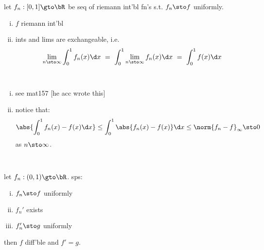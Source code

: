 \begin{lm}
    let $f_{n}:[0,1]\gto\bR$ be seq of riemann int'bl fn's s.t. $f_{n}\sto f$ uniformly.
	\begin{enumerate}[(i)]
		\item $f$ riemann int'bl
		\item ints and lims are exchangeable, i.e.
			\begin{equation*}
			    \lim_{n\sto\infty}\int_{0}^{1}f_{n}(x)\d x
				\ = \ \int_{0}^{1}\lim_{n\sto\infty}f_{n}(x)\d x
				\ = \ \int_{0}^{1}f(x)\d x
			\end{equation*}
	\end{enumerate}
\end{lm} \

\newpage
\begin{pf}[source=Primary Source Material]
    \vspace{-0.2in}
	\begin{enumerate}[(i)]
		\item see mat157 [he acc wrote this]
		\item notice that:
			\begin{equation*}
			    \abs{\int_{0}^{1}f_{n}(x)-f(x)\d x} \leq
				\int_{0}^{1}\abs{f_{n}(x)-f(x)}\d x \leq
				\norm{f_{n}-f}_{\infty} \sto 0
			\end{equation*}
			as $n\sto\infty$.
	\end{enumerate}
\end{pf} \

\begin{lm}
    let $f_{n}:(0,1)\gto\bR$. sps:
	\begin{enumerate}[(i)]
		\item $f_{n}\sto f$ uniformly
		\item $f_{n}'$ exists
		\item $f_{n}'\sto g$ uniformly
	\end{enumerate}
	then $f$ diff'ble and $f'=g$.
\end{lm} \


